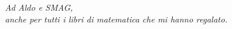 \clearpage
\thispagestyle{empty}
\vspace*{4cm}
\begin{flushright}
	\textit{Ad Aldo e SMAG,}\\
	\textit{anche per tutti i libri di matematica che mi hanno regalato.}
\end{flushright}


